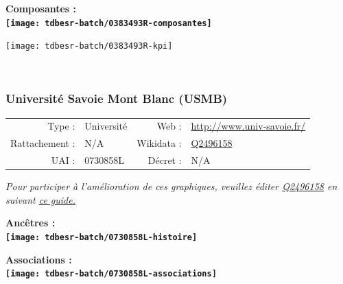 \documentclass[12pt,french,]{article}
\begin{document}
\hrulefill

\begin{center} \bf Composantes : \\  
\texttt{[image: tdbesr-batch/0383493R-composantes]} \end{center}

\begin{center}\texttt{[image: tdbesr-batch/0383493R-kpi]} \end{center}\checkoddpage

\ifoddpage \fi ~\newpage  

\hypertarget{universituxe9-savoie-mont-blanc-usmb}{%
\subsubsection{Université Savoie Mont Blanc
(USMB)}\label{universituxe9-savoie-mont-blanc-usmb}}

\begin{tabular*}{\textwidth}{rp{5cm}rl}  
\hline  
Type : & Université & Web : &\href{http://www.univ-savoie.fr/}{http://www.univ-savoie.fr/} \\  
Rattachement : & N/A & Wikidata : & \href{https://www.wikidata.org/entity/Q2496158}{Q2496158} \\  
UAI : & 0730858L & Décret : & N/A \\  
\hline  
\end{tabular*}

\textit{\scriptsize Pour participer à l'amélioration de ces graphiques, veuillez éditer  \href{https://www.wikidata.org/entity/Q2496158}{Q2496158}  en suivant \href{https://github.com/cpesr/wikidataESR/blob/master/Rmd/wikidataESR.md}{ce guide.}}

\vspace{1cm}  
\begin{minipage}[b]{0.50\textwidth}\begin{center} \bf Ancêtres : \\  
\texttt{[image: tdbesr-batch/0730858L-histoire]} \end{center}\end{minipage}\begin{minipage}[b]{0.50\textwidth}\begin{center} \bf Associations : \\  
\texttt{[image: tdbesr-batch/0730858L-associations]} \end{center}\end{minipage}

\hrulefill
\end{document}
